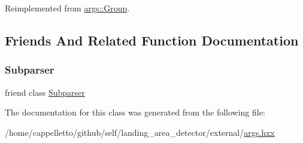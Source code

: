 Reimplemented from \hyperlink{classargs_1_1_group_a9f74bb3d58e5bfe331a6af8a9981ebda}{args\+::\+Group}.



\subsection{Friends And Related Function Documentation}
\mbox{\label{classargs_1_1_command_aecbd7c0572cb2d7fecb5eff79552c203}} 
\subsubsection{\texorpdfstring{Subparser}{Subparser}}
{\footnotesize\ttfamily friend class \hyperlink{classargs_1_1_subparser}{Subparser}\hspace{0.3cm}{\ttfamily [friend]}}



The documentation for this class was generated from the following file\+:\begin{DoxyCompactItemize}
\item 
/home/cappelletto/github/self/landing\+\_\+area\+\_\+detector/external/\hyperlink{args_8hxx}{args.\+hxx}\end{DoxyCompactItemize}
